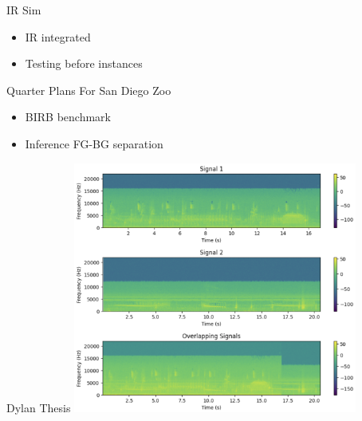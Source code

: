 \begin{frame}{IR Sim}
    \begin{itemize}
        \item IR integrated
        \item Testing before instances
    \end{itemize}
\end{frame}

\begin{frame}{Quarter Plans For San Diego Zoo}
    \begin{itemize}
        \item BIRB benchmark 
        \item Inference FG-BG separation
    \end{itemize}
\end{frame}

\begin{frame}{Dylan Thesis}
    \centering
    \includegraphics[height=0.7\textheight,width=0.7\textwidth,keepaspectratio]{dylan-aid-1-24.png}
\end{frame}







